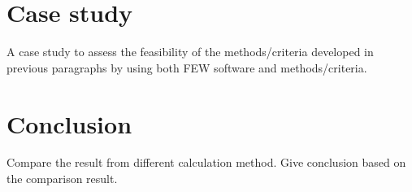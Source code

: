 
\chapter{Case study}

A case study to assess the feasibility of the methods/criteria developed in previous paragraphs by using both FEW software and methods/criteria. 


\chapter{Conclusion}

Compare the result from different calculation method. Give conclusion based on the comparison result.